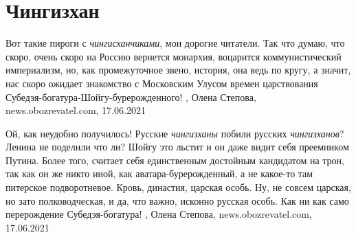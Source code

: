  
 
 
 
 
\chapter{Чингизхан}
\label{sec:slova.chingizhan}

Вот такие пироги с \emph{чингисханчиками}, мои дорогие читатели. Так что думаю,
что скоро, очень скоро на Россию вернется монархия, воцарится коммунистический
империализм, но, как промежуточное звено, история, она ведь по кругу, а значит,
нас скоро ожидает знакомство с Московским Улусом времен царствования
Субедэя-богатура-Шойгу-бурерожденного!
, 
Олена Степова, news.obozrevatel.com, 17.06.2021

Ой, как неудобно получилось! Русские \emph{чингизханы} побили русских
\emph{чингизханов}? Ленина не поделили что ли?  Шойгу это льстит и он даже
видит себя преемником Путина. Более того, считает себя единственным достойным
кандидатом на трон, так как он же никто иной, как аватара-бурерожденный, а не
какое-то там питерское подворотневое. Кровь, династия, царская особь. Ну, не
совсем царская, но зато полководческая, и да, что важно, исконно русская особь.
Как ни как само перерождение Субедэя-богатура!
, 
Олена Степова, news.obozrevatel.com, 17.06.2021

